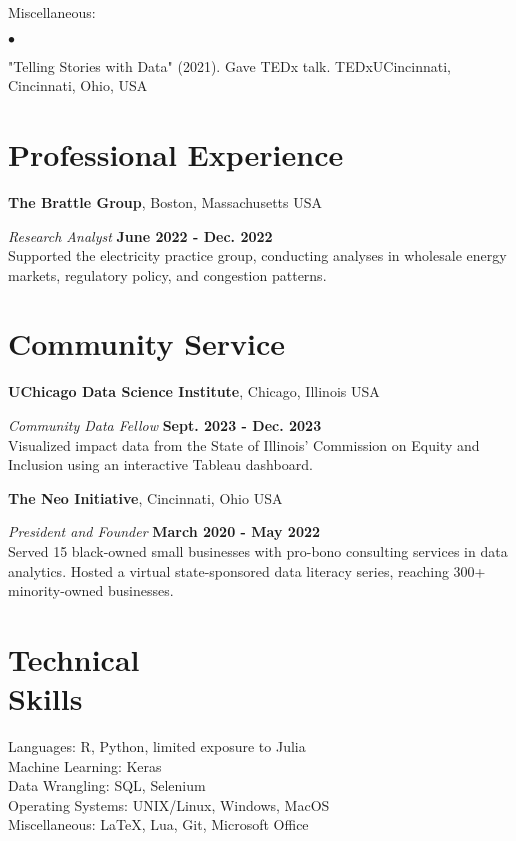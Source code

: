 \documentclass[margin,line]{res}
\newenvironment{list2}{
  \begin{list}{$\bullet$}{%
      \setlength{\itemsep}{0in}
      \setlength{\parsep}{0in} \setlength{\parskip}{0in}
      \setlength{\topsep}{0in} \setlength{\partopsep}{0in} 
      \setlength{\leftmargin}{0.2in}}}{\end{list}}
\begin{document}
\begin{resume}
Miscellaneous:
\begin{list2}
\item "Telling Stories with Data" (2021). Gave TEDx talk. TEDxUCincinnati, Cincinnati, Ohio, USA 
\end{list2}


\section{\sc Professional Experience}
{\bf The Brattle Group}, Boston, Massachusetts USA

\vspace{-.3cm}
{\em Research Analyst} \hfill {\bf June 2022 - Dec. 2022}\\
Supported the electricity practice group, conducting analyses in wholesale energy markets, regulatory policy, and congestion patterns. 


\section{\sc Community Service}
{\bf UChicago Data Science Institute}, Chicago, Illinois USA

\vspace{-.3cm}
{\em Community Data Fellow} \hfill {\bf Sept. 2023 - Dec. 2023}\\
Visualized impact data from the State of Illinois' Commission on Equity and Inclusion using an interactive Tableau dashboard. 

{\bf The Neo Initiative}, Cincinnati, Ohio USA

\vspace{-.3cm}
{\em President and Founder} \hfill {\bf March 2020 -  May 2022}\\
Served 15 black-owned small businesses with pro-bono consulting services in data analytics. Hosted a virtual state-sponsored data literacy series, reaching 300+ minority-owned businesses. 

\section{\sc Technical \\ Skills} 
Languages: R, Python, limited exposure to Julia \\
Machine Learning: Keras \\ 
Data Wrangling: SQL, Selenium \\
Operating Systems:  UNIX/Linux, Windows, MacOS \\
Miscellaneous: \LaTeX, Lua, Git, Microsoft Office


\end{resume}
\end{document}
